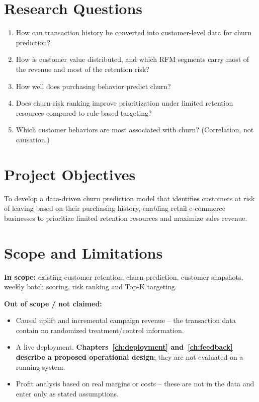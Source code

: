 \section{Research Questions}
\label{sec:1-3}

\begin{enumerate}
    \item How can transaction history be converted into customer-level data for churn prediction?
    \item How is customer value distributed, and which RFM segments carry most of the revenue and most of the retention risk?
    \item How well does purchasing behavior predict churn?
    \item Does churn-risk ranking improve prioritization under limited retention resources compared to rule-based targeting?
    \item Which customer behaviors are most associated with churn? (Correlation, not causation.)
\end{enumerate}

\section{Project Objectives}
\label{sec:1-4}

To develop a data-driven churn prediction model that identifies customers at risk of leaving based on their purchasing history, enabling retail e-commerce businesses to prioritize limited retention resources and maximize sales revenue.

\section{Scope and Limitations}
\label{sec:1-5}

\textbf{In scope:} existing-customer retention, churn prediction, customer snapshots, weekly batch scoring, risk ranking and Top-K targeting.

\textbf{Out of scope / not claimed:}
\begin{itemize}
    \item Causal uplift and incremental campaign revenue -- the transaction data contain no randomized treatment/control information.
    \item A live deployment. \textbf{Chapters~\ref{ch:deployment} and~\ref{ch:feedback} describe a proposed operational design}; they are not evaluated on a running system.
    \item Profit analysis based on real margins or costs -- these are not in the data and enter only as stated assumptions.
\end{itemize}

